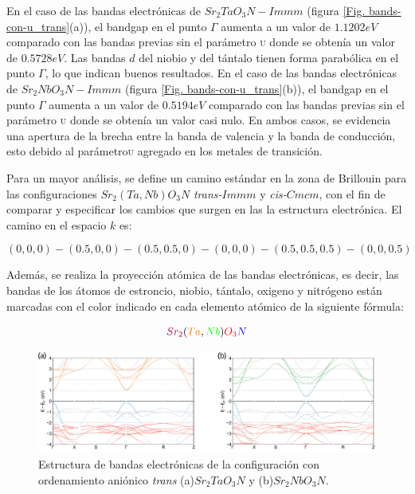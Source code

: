 En el caso de las bandas electrónicas de $Sr_{2}TaO_{3}N-Immm$ (figura \ref{Fig. bands-con-u_trans}(a)), el bandgap en el punto $\Gamma$ aumenta a un valor de $1.1202  eV$ comparado con las bandas previas sin el parámetro \textsc{u} donde se obtenía un valor de $0.5728  eV$. Las bandas $d$ del niobio y del tántalo tienen forma parabólica en el punto $\Gamma$, lo que indican buenos resultados. En el caso de las bandas electrónicas de $Sr_{2}NbO_{3}N-Immm$ (figura \ref{Fig. bands-con-u_trans}(b)), el bandgap en el punto $\Gamma$ aumenta a un valor de $0.5194  eV$ comparado con las bandas previas sin el parámetro \textsc{u} donde se obtenía un valor casi nulo. En ambos casos, se evidencia una apertura de la brecha entre la banda de valencia y la banda de conducción, esto debido al parámetro\textsc{u} agregado en los metales de transición.

Para un mayor análisis, se define un camino estándar en la zona de Brillouin para las configuraciones $Sr_{2}(Ta,Nb)O_{3}N$ \emph{trans-}$Immm$ y \emph{cis-}$Cmcm$, con el fin de comparar y especificar los cambios que surgen en las la estructura electrónica. El camino en el espacio $k$ es:

$$(0,0,0)-(0.5,0,0)-(0.5,0.5,0)-(0,0,0)-(0.5,0.5,0.5)-(0,0,0.5)$$

Además, se realiza la proyección atómica de las bandas electrónicas,  es decir, las bandas de los átomos de estroncio, niobio, tántalo, oxigeno y nitrógeno están marcadas con el color indicado en cada elemento atómico de la siguiente fórmula:

$$\textcolor{purple}{Sr_{2}}(\textcolor{orange}{Ta},\textcolor{green}{Nb})\textcolor{O}{O_{3}}\textcolor{blue}{N}$$

\begin{figure}[H]
    \centering
    \includegraphics[width=1\textwidth]{Figs/trans-all.png}
    \caption{Estructura de bandas electrónicas de la configuración con ordenamiento aniónico \emph{trans} (a)$Sr_{2}TaO_{3}N$ y  (b)$Sr_{2}NbO_{3}N$.}%
    \label{Fig. bandas_trans_estandar}
\end{figure}

